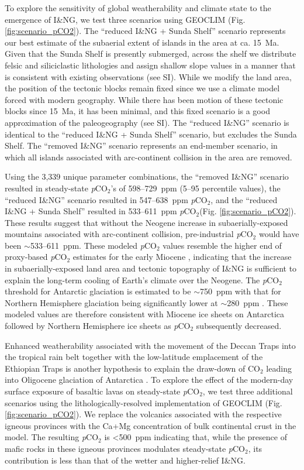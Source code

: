 \documentclass[11pt,letterpaper]{article}
\newcommand{\pCOtwo}{\textit{p}CO$_{2}$\xspace}
\newcommand{\COtwo}{CO$_{2}$\xspace}
\begin{document}
To explore the sensitivity of global weatherability and climate state to the emergence of I\&NG, we test three scenarios using GEOCLIM (Fig. \ref{fig:scenario_pCO2}). The ``reduced I\&NG + Sunda Shelf'' scenario represents our best estimate of the subaerial extent of islands in the area at ca. 15~Ma. Given that the Sunda Shelf is presently submerged, across the shelf we distribute felsic and siliciclastic lithologies and assign shallow slope values in a manner that is consistent with existing observations (see SI). While we modify the land area, the position of the tectonic blocks remain fixed since we use a climate model forced with modern geography. While there has been motion of these tectonic blocks since 15~Ma, it has been minimal, and this fixed scenario is a good approximation of the paleogeography (see SI). The ``reduced I\&NG'' scenario is identical to the ``reduced I\&NG + Sunda Shelf'' scenario, but excludes the Sunda Shelf. The ``removed I\&NG'' scenario represents an end-member scenario, in which all islands associated with arc-continent collision in the area are removed.

Using the 3,339 unique parameter combinations, the ``removed I\&NG'' scenario resulted in steady-state \pCOtwo's of 598--729~ppm (5--95 percentile values), the ``reduced I\&NG'' scenario resulted in 547--638~ppm \pCOtwo, and the ``reduced I\&NG + Sunda Shelf'' resulted in 533--611~ppm \pCOtwo (Fig. \ref{fig:scenario_pCO2}). These results suggest that without the Neogene increase in subaerially-exposed mountains associated with arc-continent collision, pre-industrial \pCOtwo would have been $\sim$533--611~ppm. These modeled \pCOtwo values resemble the higher end of proxy-based \pCOtwo estimates for the early Miocene \cite{Foster2017a}, indicating that the increase in subaerially-exposed land area and tectonic topography of I\&NG is sufficient to explain the long-term cooling of Earth's climate over the Neogene. The \pCOtwo threshold for Antarctic glaciation is estimated to be $\sim$750~ppm with that for Northern Hemisphere glaciation being significantly lower at $\sim$280~ppm \cite{DeConto2008a}. These modeled values are therefore consistent with Miocene ice sheets on Antarctica followed by Northern Hemisphere ice sheets as \pCOtwo subsequently decreased.

Enhanced weatherability associated with the movement of the Deccan Traps into the tropical rain belt together with the low-latitude emplacement of the Ethiopian Traps is another hypothesis to explain the draw-down of \COtwo leading into Oligocene glaciation of Antarctica \cite{Kent2008a, Kent2013a}. To explore the effect of the modern-day surface exposure of basaltic lavas on steady-state \pCOtwo, we test three additional scenarios using the lithologically-resolved implementation of GEOCLIM (Fig. \ref{fig:scenario_pCO2}). We replace the volcanics associated with the respective igneous provinces with the Ca+Mg concentration of bulk continental crust in the model. The resulting \pCOtwo is \textless500~ppm indicating that, while the presence of mafic rocks in these igneous provinces modulates steady-state \pCOtwo, its contribution is less than that of the wetter and higher-relief I\&NG.
\end{document}
